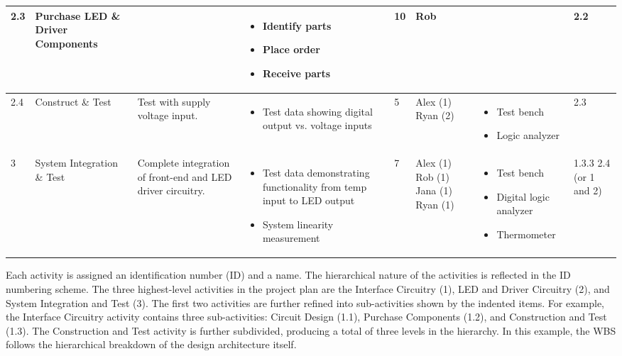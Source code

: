 \begin{table}
\begin{tabular}{|m{1cm}|m{1.5cm}|m{2cm}|m{2cm}|m{1cm}|m{1cm}|m{2.5cm}|m{1cm}|   }
2.3 &  Purchase LED \& Driver Components & & 
	\begin{itemize} \item Identify parts \item Place order \item Receive parts \end{itemize}
	& 10 & Rob & & 2.2 \\ \hline

2.4 & Construct \& Test & Test with supply voltage input. & 
	\begin{itemize} \item Test data showing digital output vs. voltage inputs \end{itemize}
	& 5 & Alex (1) Ryan (2) & \begin{itemize} \item Test bench \item Logic analyzer \end{itemize}
	& 2.3 \\ \hline

3 & System Integration \& Test & Complete integration of front-end and LED driver circuitry. & 
	\begin{itemize} \item Test data demonstrating functionality from temp input to LED output
					\item System linearity measurement \end{itemize}
	 & 7 & Alex (1) Rob (1) Jana (1) Ryan (1) & 
	\begin{itemize} \item Test bench \item Digital logic analyzer \item Thermometer \end{itemize}
	& 1.3.3 2.4 (or 1 and 2) \\ \hline
\end{tabular}
\end{table}


Each activity is assigned an identification number (ID) and a name. The
hierarchical nature of the activities is reflected in the ID numbering
scheme. The three highest-level activities in the project plan are the
Interface Circuitry (1), LED and Driver Circuitry (2), and System
Integration and Test (3). The first two activities are further refined
into sub-activities shown by the indented items. For example, the
Interface Circuitry activity contains three sub-activities: Circuit
Design (1.1), Purchase Components (1.2), and Construction and Test
(1.3). The Construction and Test activity is further subdivided,
producing a total of three levels in the hierarchy. In this example, the
WBS follows the hierarchical breakdown of the design architecture
itself.


